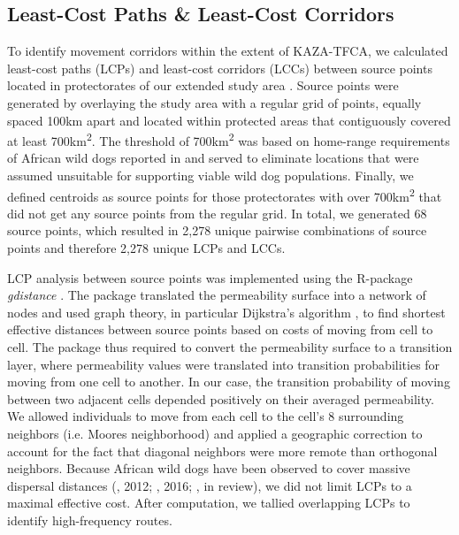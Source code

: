 \documentclass[abstract=on,10pt,a4paper,bibliography=totocnumbered]{scrartcl}
\begin{document}
\subsection{Least-Cost Paths \& Least-Cost Corridors}
To identify movement corridors within the extent of KAZA-TFCA, we calculated
least-cost paths (LCPs) and least-cost corridors (LCCs) between source points
located in protectorates of our extended study area \citep{Adriaensen.2003,
Sawyer.2011}. Source points were generated by overlaying the study area with a
regular grid of points, equally spaced 100km apart and located within protected
areas that contiguously covered at least 700km\textsuperscript{2}. The threshold
of 700km\textsuperscript{2} was based on home-range requirements of African wild
dogs reported in \cite{Pomilia.2015} and served to eliminate locations that were
assumed unsuitable for supporting viable wild dog populations. Finally, we
defined centroids as source points for those protectorates with over
700km\textsuperscript{2} that did not get any source points from the regular
grid. In total, we generated 68 source points, which resulted in 2,278 unique
pairwise combinations of source points and therefore 2,278 unique LCPs and LCCs.

LCP analysis between source points was implemented using the R-package
\textit{gdistance} \citep{vanEtten.2018}. The package translated the
permeability surface into a network of nodes and used graph theory, in
particular Dijkstra's algorithm \citep{Dijkstra.1959}, to find shortest
effective distances between source points based on costs of moving from cell to
cell. The package thus required to convert the permeability surface to a
transition layer, where permeability values were translated into transition
probabilities for moving from one cell to another. In our case, the transition
probability of moving between two adjacent cells depended positively on their
averaged permeability. We allowed individuals to move from each cell to the
cell's 8 surrounding neighbors (i.e. Moores neighborhood) and applied a
geographic correction to account for the fact that diagonal neighbors were more
remote than orthogonal neighbors. Because African wild dogs have been observed
to cover massive dispersal distances (\citeauthor{DaviesMostert.2012}, 2012;
\citeauthor{Masenga.2016}, 2016; \citeauthor{Cozzi.2019}, in review), we did not
limit LCPs to a maximal effective cost. After computation, we tallied
overlapping LCPs to identify high-frequency routes.
\end{document}
